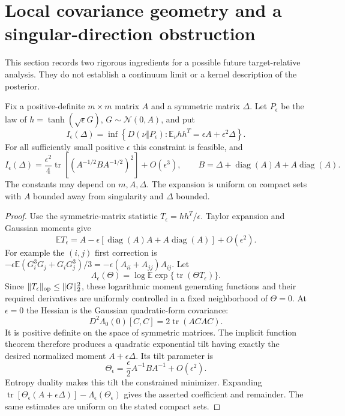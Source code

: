 \section{Local covariance geometry and a singular-direction obstruction}
\label{sec:critical-local-geometry}

This section records two rigorous ingredients for a possible future
target-relative analysis. They do not establish a continuum limit or
a kernel description of the posterior.

\begin{proposition}
\label{prop:critical-local-fisher}
Fix a positive-definite $m\times m$ matrix $A$ and a symmetric matrix
$\Delta$. Let $P_\epsilon$ be the law of
$h=\tanh(\sqrt\epsilon G)$, $G\sim\mathcal N(0,A)$, and put
\[
 I_\epsilon(\Delta)=\inf\left\{
 D(\nu\Vert P_\epsilon):
       \mathbb E_\nu hh^T=\epsilon A+\epsilon^2\Delta\right\}.
\]
For all sufficiently small positive $\epsilon$ this constraint is
feasible, and
\[
 I_\epsilon(\Delta)=\frac{\epsilon^2}{4}
 \operatorname{tr}\left[
  \left(A^{-1/2}BA^{-1/2}\right)^2\right]+O(\epsilon^3),
 \qquad
 B=\Delta+\operatorname{diag}(A)A+A\operatorname{diag}(A).
\]
The constants may depend on $m,A,\Delta$. The expansion is uniform
on compact sets with $A$ bounded away from singularity and $\Delta$
bounded.
\end{proposition}

\begin{proof}
Use the symmetric-matrix statistic $T_\epsilon=hh^T/\epsilon$.
Taylor expansion and Gaussian moments give
\[
 \mathbb E T_\epsilon
 =A-\epsilon[\operatorname{diag}(A)A+
                         A\operatorname{diag}(A)]+O(\epsilon^2).
\]
For example the $(i,j)$ first correction is
$-\epsilon\mathbb E(G_i^3G_j+G_iG_j^3)/3
=-\epsilon(A_{ii}+A_{jj})A_{ij}$.
Let
\[
 \Lambda_\epsilon(\Theta)
 =\log\mathbb E\exp\{\operatorname{tr}(\Theta T_\epsilon)\}.
\]
Since $\|T_\epsilon\|_{\rm op}\le\|G\|_2^2$, these logarithmic
moment generating functions and their required derivatives are
uniformly controlled in a fixed neighborhood of $\Theta=0$.
At $\epsilon=0$ the Hessian is the Gaussian quadratic-form covariance:
\[
 D^2\Lambda_0(0)[C,C]=2\operatorname{tr}(ACAC).
\]
It is positive definite on the space of symmetric matrices.
The implicit function theorem therefore produces a quadratic
exponential tilt having exactly the desired normalized moment
$A+\epsilon\Delta$. Its tilt parameter is
\[
 \Theta_\epsilon=\frac\epsilon2 A^{-1}BA^{-1}
                       +O(\epsilon^2).
\]
Entropy duality makes this tilt the constrained minimizer. Expanding
$\operatorname{tr}[\Theta_\epsilon(A+\epsilon\Delta)]
-\Lambda_\epsilon(\Theta_\epsilon)$ gives the asserted coefficient
and remainder. The same estimates are uniform on the stated compact
sets.
\end{proof}

